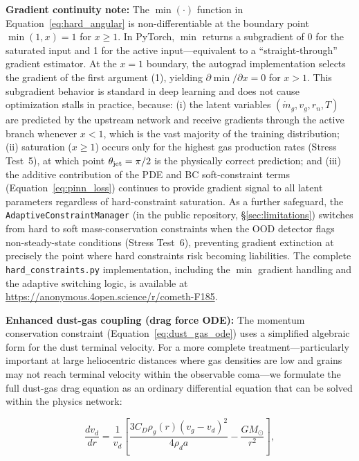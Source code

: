 \documentclass[usenatbib]{mnras}
\begin{document}
\textbf{Gradient continuity note:} The $\min(\cdot)$ function in Equation~\ref{eq:hard_angular} is non-differentiable at the boundary point $\min(1, x) = 1$ for $x \geq 1$. In PyTorch, $\min$ returns a subgradient of 0 for the saturated input and 1 for the active input---equivalent to a ``straight-through'' gradient estimator. At the $x = 1$ boundary, the autograd implementation selects the gradient of the first argument (1), yielding $\partial\min/\partial x = 0$ for $x > 1$. This subgradient behavior is standard in deep learning and does not cause optimization stalls in practice, because: (i) the latent variables $(\dot{m}_g, v_g, r_n, T)$ are predicted by the upstream network and receive gradients through the active branch whenever $x < 1$, which is the vast majority of the training distribution; (ii) saturation ($x \geq 1$) occurs only for the highest gas production rates (Stress Test~5), at which point $\theta_{\rm jet} = \pi/2$ is the physically correct prediction; and (iii) the additive contribution of the PDE and BC soft-constraint terms (Equation~\ref{eq:pinn_loss}) continues to provide gradient signal to all latent parameters regardless of hard-constraint saturation. As a further safeguard, the \texttt{AdaptiveConstraintManager} (in the public repository, \S\ref{sec:limitations}) switches from hard to soft mass-conservation constraints when the OOD detector flags non-steady-state conditions (Stress Test~6), preventing gradient extinction at precisely the point where hard constraints risk becoming liabilities. The complete \texttt{hard\_constraints.py} implementation, including the $\min$ gradient handling and the adaptive switching logic, is available at \url{https://anonymous.4open.science/r/cometh-F185}.

\textbf{Enhanced dust-gas coupling (drag force ODE):} The momentum conservation constraint (Equation~\ref{eq:dust_gas_ode}) uses a simplified algebraic form for the dust terminal velocity. For a more complete treatment---particularly important at large heliocentric distances where gas densities are low and grains may not reach terminal velocity within the observable coma---we formulate the full dust-gas drag equation as an ordinary differential equation that can be solved within the physics network:

\begin{equation}\label{eq:dust_gas_ode}
\frac{d v_d}{d r} = \frac{1}{v_d}\left[\frac{3 C_D \rho_g(r) (v_g - v_d)^2}{4 \rho_d a} - \frac{G M_{\odot}}{r^2}\right],
\end{equation}
\end{document}
